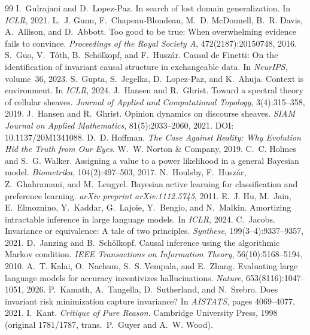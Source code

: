 \documentclass[11pt,a4paper]{article}
\theoremstyle{definition}
\theoremstyle{remark}
\begin{document}
\begin{thebibliography}{99}
 I.~Gulrajani and D.~Lopez-Paz. In search of lost domain generalization. In \emph{ICLR}, 2021.
 L.~J. Gunn, F.~Chapeau-Blondeau, M.~D. McDonnell, B.~R. Davis, A.~Allison, and D.~Abbott. Too good to be true: When overwhelming evidence fails to convince. \emph{Proceedings of the Royal Society A}, 472(2187):20150748, 2016.
 S.~Guo, V.~T\'oth, B.~Sch\"olkopf, and F.~Husz\'ar. Causal de {F}inetti: On the identification of invariant causal structure in exchangeable data. In \emph{NeurIPS}, volume~36, 2023.
 S.~Gupta, S.~Jegelka, D.~Lopez-Paz, and K.~Ahuja. Context is environment. In \emph{ICLR}, 2024.
 J.~Hansen and R.~Ghrist. Toward a spectral theory of cellular sheaves. \emph{Journal of Applied and Computational Topology}, 3(4):315--358, 2019.
 J.~Hansen and R.~Ghrist. Opinion dynamics on discourse sheaves. \emph{SIAM Journal on Applied Mathematics}, 81(5):2033--2060, 2021. DOI: 10.1137/20M1341088.
 D.~D. Hoffman. \emph{The Case Against Reality: Why Evolution Hid the Truth from Our Eyes}. W.~W. Norton \& Company, 2019.
 C.~C. Holmes and S.~G. Walker. Assigning a value to a power likelihood in a general {B}ayesian model. \emph{Biometrika}, 104(2):497--503, 2017.
 N.~Houlsby, F.~Husz\'ar, Z.~Ghahramani, and M.~Lengyel. Bayesian active learning for classification and preference learning. \emph{arXiv preprint arXiv:1112.5745}, 2011.
 E.~J. Hu, M.~Jain, E.~Elmoznino, Y.~Kaddar, G.~Lajoie, Y.~Bengio, and N.~Malkin. Amortizing intractable inference in large language models. In \emph{ICLR}, 2024.
 C.~Jacobs. Invariance or equivalence: A tale of two principles. \emph{Synthese}, 199(3--4):9337--9357, 2021.
 D.~Janzing and B.~Sch\"olkopf. Causal inference using the algorithmic {M}arkov condition. \emph{IEEE Transactions on Information Theory}, 56(10):5168--5194, 2010.
 A.~T. Kalai, O.~Nachum, S.~S. Vempala, and E.~Zhang. Evaluating large language models for accuracy incentivizes hallucinations. \emph{Nature}, 653(8116):1047--1051, 2026.
 P.~Kamath, A.~Tangella, D.~Sutherland, and N.~Srebro. Does invariant risk minimization capture invariance? In \emph{AISTATS}, pages 4069--4077, 2021.
 I.~Kant. \emph{Critique of Pure Reason}. Cambridge University Press, 1998 (original 1781/1787, trans.\ P.~Guyer and A.~W. Wood).

\end{thebibliography}
\end{document}
